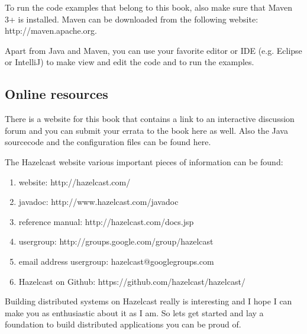 To run the code examples that belong to this book, also make sure that Maven 3+ is installed. Maven can be downloaded from the following website: 
http://maven.apache.org.

Apart from Java and Maven, you can use your favorite editor or IDE (e.g. Eclipse or IntelliJ) to make view and edit the code and to run the examples. 

\subsection*{Online resources}

There is a website for this book that contains a link to an interactive discussion forum and you can submit your errata to the book here as well. Also the Java sourcecode and the configuration files can be found here. 

The Hazelcast website various important pieces of information can be found:
\begin{enumerate}
\item website: http://hazelcast.com/
\item javadoc: http://www.hazelcast.com/javadoc
\item reference manual: http://hazelcast.com/docs.jsp
\item usergroup: http://groups.google.com/group/hazelcast
\item email address usergroup: hazelcast@googlegroups.com
\item Hazelcast on Github: https://github.com/hazelcast/hazelcast/
\end{enumerate}

Building distributed systems on Hazelcast really is interesting and I hope I can make you as enthusiastic about it as I am. So lets get started and lay a foundation to build distributed applications you can be proud of.

